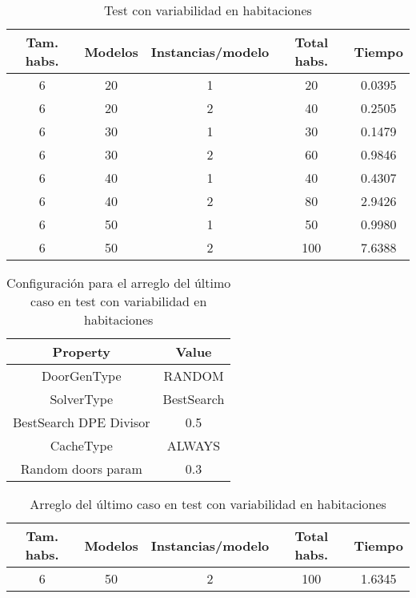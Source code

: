 \begin{table}[H]
\begin{center}
	\begin{tabular}{ | c | c | c | c | c | }
\hline
Tam. habs. & Modelos & Instancias/modelo & Total habs. & Tiempo \\ \hline 
6 & 20 & 1 & 20 & 0.0395 \\ 
6 & 20 & 2 & 40 & 0.2505 \\ 
6 & 30 & 1 & 30 & 0.1479 \\ 
6 & 30 & 2 & 60 & 0.9846 \\ 
6 & 40 & 1 & 40 & 0.4307 \\ 
6 & 40 & 2 & 80 & 2.9426 \\ 
6 & 50 & 1 & 50 & 0.9980 \\ 
6 & 50 & 2 & 100 & 7.6388 \\ 
\hline
	\end{tabular}
\end{center}
\caption{Test con variabilidad en habitaciones}
\label{table:optvarsample}
\end{table}


\begin{table}[H]
\begin{center}
	\begin{tabular}{ | c | c | }
\hline
 		Property & Value \\ \hline
DoorGenType & RANDOM \\ 
SolverType & BestSearch \\ 
BestSearch DPE Divisor & 0.5 \\ 
CacheType & ALWAYS \\ 
Random doors param & 0.3 \\ 
\hline
	\end{tabular}
\end{center}
\caption{Configuración para el arreglo del último caso en test con variabilidad en habitaciones}
\label{table:cfg-optvarfix}
\end{table}


\begin{table}[H]
\begin{center}
	\begin{tabular}{ | c | c | c | c | c | }
\hline
Tam. habs. & Modelos & Instancias/modelo & Total habs. & Tiempo \\ \hline 
6 & 50 & 2 & 100 & 1.6345 \\ 
\hline
	\end{tabular}
\end{center}
\caption{Arreglo del último caso en test con variabilidad en habitaciones}
\label{table:optvarfix}
\end{table}



